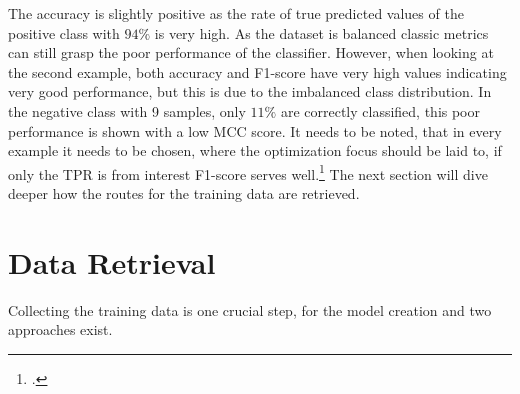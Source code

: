 The accuracy is slightly positive as the rate of true predicted values of the positive class
with $94\%$ is very high. As the dataset is balanced classic metrics can still grasp
the poor performance of the classifier. However, when looking at the second example, both
accuracy and F1-score have very high values indicating very good performance, but this is
due to the imbalanced class distribution. In the negative class with 9 samples, only $11\%$
are correctly classified, this poor performance is shown with a low \gls{MCC} score. It needs
to be noted, that in every example it needs to be chosen, where the optimization focus should
be laid to, if only the \gls{TPR} is from interest F1-score serves well.\footcite[cf.][p.8f.]{chicco_advantages_2020}
The next section will dive deeper how the routes for the training data are retrieved.


\section{Data Retrieval}
\label{sec:DataRetrieval}
Collecting the training data is one crucial step, for the model creation and two approaches exist.

